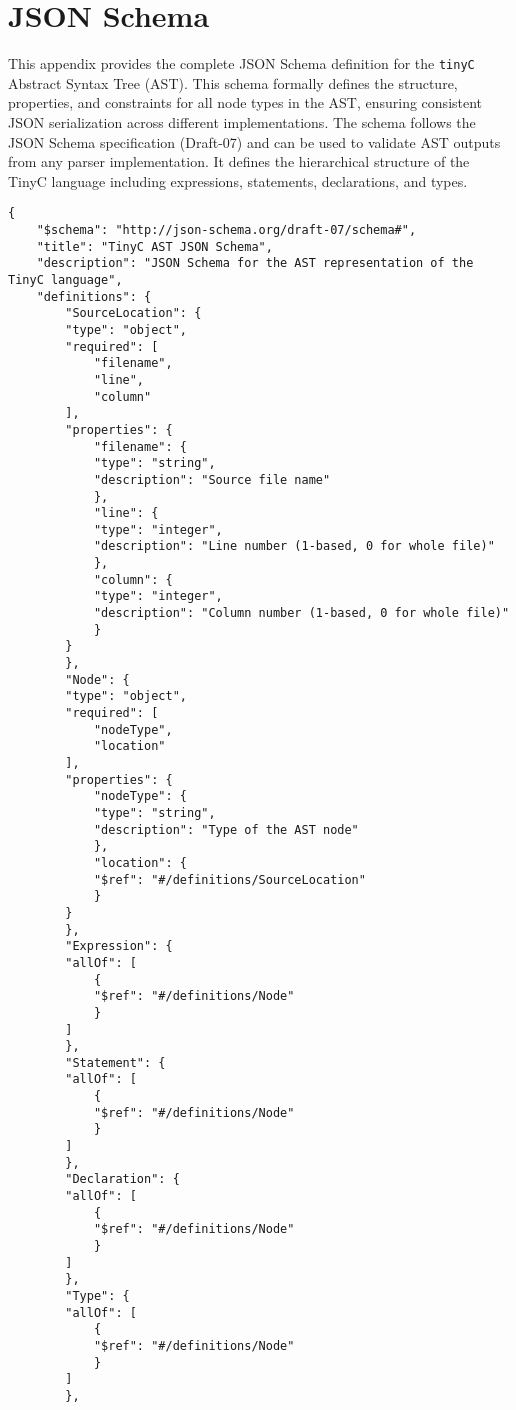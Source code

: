 \chapter{JSON Schema}
\label{appendix-b}
This appendix provides the complete JSON Schema definition for the \texttt{tinyC} Abstract Syntax Tree (AST). This schema formally defines the structure, properties, and constraints for all node types in the AST, ensuring consistent JSON serialization across different implementations.
The schema follows the JSON Schema specification (Draft-07) and can be used to validate AST outputs from any parser implementation. It defines the hierarchical structure of the TinyC language including expressions, statements, declarations, and types.




\begin{lstlisting}
{
    "$schema": "http://json-schema.org/draft-07/schema#",
    "title": "TinyC AST JSON Schema",
    "description": "JSON Schema for the AST representation of the TinyC language",
    "definitions": {
        "SourceLocation": {
        "type": "object",
        "required": [
            "filename",
            "line",
            "column"
        ],
        "properties": {
            "filename": {
            "type": "string",
            "description": "Source file name"
            },
            "line": {
            "type": "integer",
            "description": "Line number (1-based, 0 for whole file)"
            },
            "column": {
            "type": "integer",
            "description": "Column number (1-based, 0 for whole file)"
            }
        }
        },
        "Node": {
        "type": "object",
        "required": [
            "nodeType",
            "location"
        ],
        "properties": {
            "nodeType": {
            "type": "string",
            "description": "Type of the AST node"
            },
            "location": {
            "$ref": "#/definitions/SourceLocation"
            }
        }
        },
        "Expression": {
        "allOf": [
            {
            "$ref": "#/definitions/Node"
            }
        ]
        },
        "Statement": {
        "allOf": [
            {
            "$ref": "#/definitions/Node"
            }
        ]
        },
        "Declaration": {
        "allOf": [
            {
            "$ref": "#/definitions/Node"
            }
        ]
        },
        "Type": {
        "allOf": [
            {
            "$ref": "#/definitions/Node"
            }
        ]
        },

\end{lstlisting}
